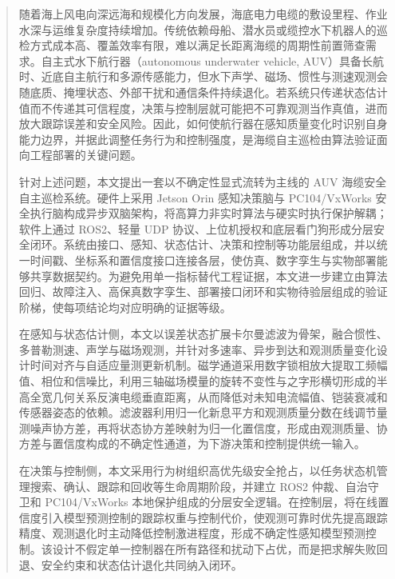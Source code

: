 
\begin{abstract}
  随着海上风电向深远海和规模化方向发展，海底电力电缆的敷设里程、作业水深与运维复杂度持续增加。传统依赖母船、潜水员或缆控水下机器人的巡检方式成本高、覆盖效率有限，难以满足长距离海缆的周期性前置筛查需求。自主式水下航行器（autonomous underwater vehicle, AUV）具备长航时、近底自主航行和多源传感能力，但水下声学、磁场、惯性与测速观测会随底质、掩埋状态、外部干扰和通信条件持续退化。若系统只传递状态估计值而不传递其可信程度，决策与控制层就可能把不可靠观测当作真值，进而放大跟踪误差和安全风险。因此，如何使航行器在感知质量变化时识别自身能力边界，并据此调整任务行为和控制强度，是海缆自主巡检由算法验证面向工程部署的关键问题。

  针对上述问题，本文提出一套以不确定性显式流转为主线的 AUV 海缆安全自主巡检系统。硬件上采用 Jetson Orin 感知决策脑与 PC104/VxWorks 安全执行脑构成异步双脑架构，将高算力非实时算法与硬实时执行保护解耦；软件上通过 ROS2、轻量 UDP 协议、上位机授权和底层看门狗形成分层安全闭环。系统由接口、感知、状态估计、决策和控制等功能层组成，并以统一时间戳、坐标系和置信度接口连接各层，使仿真、数字孪生与实物部署能够共享数据契约。为避免用单一指标替代工程证据，本文进一步建立由算法回归、故障注入、高保真数字孪生、部署接口闭环和实物待验层组成的验证阶梯，使每项结论均对应明确的证据等级。

  在感知与状态估计侧，本文以误差状态扩展卡尔曼滤波为骨架，融合惯性、多普勒测速、声学与磁场观测，并针对多速率、异步到达和观测质量变化设计时间对齐与自适应量测更新机制。磁学通道采用数字锁相放大提取工频幅值、相位和信噪比，利用三轴磁场模量的旋转不变性与之字形横切形成的半高全宽几何关系反演电缆垂直距离，从而降低对未知电流幅值、铠装衰减和传感器姿态的依赖。滤波器利用归一化新息平方和观测质量分数在线调节量测噪声协方差，再将状态协方差映射为归一化置信度，形成由观测质量、协方差与置信度构成的不确定性通道，为下游决策和控制提供统一输入。

  在决策与控制侧，本文采用行为树组织高优先级安全抢占，以任务状态机管理搜索、确认、跟踪和回收等生命周期阶段，并建立 ROS2 仲裁、自治守卫和 PC104/VxWorks 本地保护组成的分层安全逻辑。在控制层，将在线置信度引入模型预测控制的跟踪权重与控制代价，使观测可靠时优先提高跟踪精度、观测退化时主动降低控制激进程度，形成不确定性感知模型预测控制。该设计不假定单一控制器在所有路径和扰动下占优，而是把求解失败回退、安全约束和状态估计退化共同纳入闭环。


\end{abstract}

